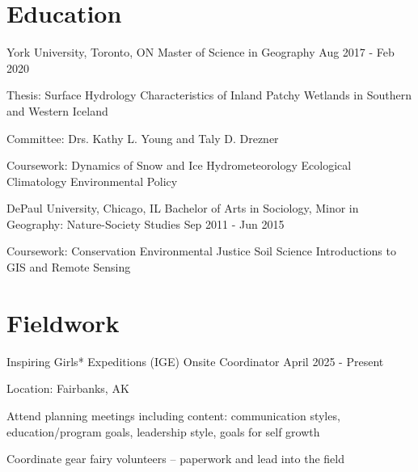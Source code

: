 \documentclass{../styles/cv}
\begin{document}
\populatedtitle

\section{Education}

\subsectionpositiondate
    {York University, Toronto, ON}
    {Master of Science in Geography}
    {Aug 2017 - Feb 2020}
\resumesublistbegin
    \item Thesis: Surface Hydrology Characteristics of Inland Patchy Wetlands in Southern and Western Iceland
    \item Committee: Drs. Kathy L. Young and Taly D. Drezner
    \item Coursework: Dynamics of Snow and Ice \titleseperator Hydrometeorology \titleseperator Ecological Climatology \titleseperator Environmental Policy
\resumesublistend

\subsectionpositiondate
    {DePaul University, Chicago, IL}
    {Bachelor of Arts in Sociology, Minor in Geography: Nature-Society Studies}
    {Sep 2011 - Jun 2015}
\resumesublistbegin
    \item Coursework: Conservation \titleseperator Environmental Justice \titleseperator Soil Science \titleseperator Introductions to GIS and Remote Sensing
\resumesublistend

\section{Fieldwork}

\subsectionpositiondate
    {Inspiring Girls* Expeditions (IGE)}
    {Onsite Coordinator}
    {April 2025 - Present}
\resumesublistbegin
    \item Location: Fairbanks, AK
    \item Attend planning meetings including content: communication styles, education/program goals, leadership style, goals for self growth
    \item Coordinate gear fairy volunteers -- paperwork and lead into the field
\resumesublistend
\end{document}

